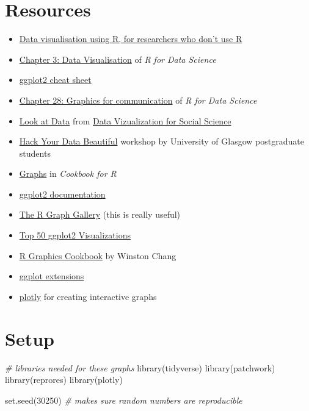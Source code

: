 \documentclass[
  oneside]{book}
\newenvironment{Shaded}{\begin{snugshade}}{\end{snugshade}}
\newcommand{\CommentTok}[1]{\textcolor[rgb]{0.56,0.35,0.01}{\textit{#1}}}
\newcommand{\DecValTok}[1]{\textcolor[rgb]{0.00,0.00,0.81}{#1}}
\newcommand{\FunctionTok}[1]{\textcolor[rgb]{0.00,0.00,0.00}{#1}}
\newcommand{\NormalTok}[1]{#1}
\providecommand{\tightlist}{%
  \setlength{\itemsep}{0pt}\setlength{\parskip}{0pt}}
\begin{document}
\hypertarget{resources3}{%
\section{Resources}\label{resources3}}

\begin{itemize}
\tightlist
\item
  \href{https://psyarxiv.com/4huvw/}{Data visualisation using R, for researchers who don't use R}
\item
  \href{http://r4ds.had.co.nz/data-visualisation.html}{Chapter 3: Data Visualisation} of \emph{R for Data Science}
\item
  \href{https://github.com/rstudio/cheatsheets/raw/master/data-visualization-2.1.pdf}{ggplot2 cheat sheet}
\item
  \href{http://r4ds.had.co.nz/graphics-for-communication.html}{Chapter 28: Graphics for communication} of \emph{R for Data Science}
\item
  \href{http://socviz.co/look-at-data.html}{Look at Data} from \href{http://socviz.co/}{Data Vizualization for Social Science}
\item
  \href{https://psyteachr.github.io/hack-your-data/}{Hack Your Data Beautiful} workshop by University of Glasgow postgraduate students
\item
  \href{http://www.cookbook-r.com/Graphs}{Graphs} in \emph{Cookbook for R}
\item
  \href{https://ggplot2.tidyverse.org/reference/}{ggplot2 documentation}
\item
  \href{http://www.r-graph-gallery.com/}{The R Graph Gallery} (this is really useful)
\item
  \href{http://r-statistics.co/Top50-Ggplot2-Visualizations-MasterList-R-Code.html}{Top 50 ggplot2 Visualizations}
\item
  \href{http://www.cookbook-r.com/Graphs/}{R Graphics Cookbook} by Winston Chang
\item
  \href{https://www.ggplot2-exts.org/}{ggplot extensions}
\item
  \href{https://plot.ly/ggplot2/}{plotly} for creating interactive graphs
\end{itemize}

\hypertarget{setup_ggplot}{%
\section{Setup}\label{setup_ggplot}}

\begin{Shaded}
\begin{Highlighting}[]
\CommentTok{\# libraries needed for these graphs}
\FunctionTok{library}\NormalTok{(tidyverse)}
\FunctionTok{library}\NormalTok{(patchwork) }
\FunctionTok{library}\NormalTok{(reprores)}
\FunctionTok{library}\NormalTok{(plotly)}

\FunctionTok{set.seed}\NormalTok{(}\DecValTok{30250}\NormalTok{) }\CommentTok{\# makes sure random numbers are reproducible}
\end{Highlighting}
\end{Shaded}
\end{document}
